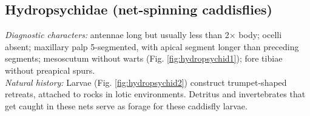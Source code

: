 \documentclass[letterpaper, 11pt]{article}
\begin{document}
\subsection{Hydropsychidae (net-spinning caddisflies)}
\noindent{}\textit{Diagnostic characters:} antennae long but usually less than 2$\times$ body; ocelli absent; maxillary palp 5-segmented, with apical segment longer than preceding segments; mesoscutum without warts (Fig. \ref{fig:hydropsychid1}); fore tibiae without preapical spurs.\\

\noindent{}\textit{Natural history:} Larvae (Fig. \ref{fig:hydropsychid2}) construct trumpet-shaped retreats, attached to rocks in lotic environments. Detritus and invertebrates that get caught in these nets serve as forage for these caddisfly larvae. 
\end{document}

